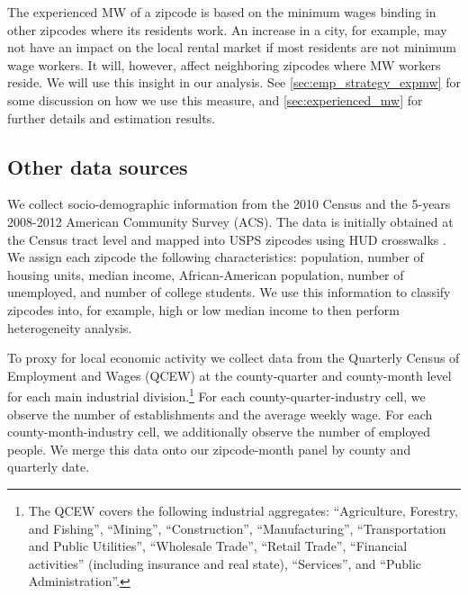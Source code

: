The experienced MW of a zipcode is based on the minimum wages binding in other zipcodes 
where its residents work. An increase in a city, for example, may not have an impact on 
the local rental market if most residents are not minimum wage workers. It will, however, 
affect neighboring zipcodes where MW workers reside. We will use this insight in our 
analysis. See \autoref{sec:emp_strategy_expmw} for some discussion on how we use this 
measure, and \autoref{sec:experienced_mw} for further details and estimation results.

\subsection{Other data sources}\label{sec:data/other_data}

We collect socio-demographic information from the 2010 Census and the 5-years 2008-2012 
American Community Survey (ACS). The data is initially obtained at the Census tract 
level and mapped into USPS zipcodes using HUD crosswalks \parencite{hudCrosswalks}. We 
assign each zipcode the following characteristics: population, number of housing units, 
median income, African-American population, number of unemployed, and number of college 
students. We use this information to classify zipcodes into, for example, high or low median 
income to then perform heterogeneity analysis.

To proxy for local economic activity we collect data from the Quarterly Census of 
Employment and Wages (QCEW) at the county-quarter and county-month level for each main 
industrial division.\footnote{The QCEW covers the following industrial aggregates: 
	``Agriculture, Forestry, and Fishing'', ``Mining'', ``Construction'', ``Manufacturing'', 
	``Transportation and Public Utilities'', ``Wholesale Trade'', ``Retail Trade'',
	``Financial activities'' (including insurance and real state), ``Services'', and 
	``Public Administration''.} 
For each county-quarter-industry cell, we observe the number of establishments and the 
average weekly wage. For each county-month-industry cell, we additionally observe the number 
of employed people. We merge this data onto our zipcode-month panel by county and 
quarterly date.


